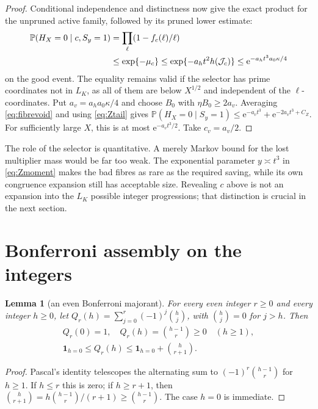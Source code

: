 \documentclass[10pt,reqno]{amsart}
\newtheorem{lemma}[theorem]{Lemma}
\theoremstyle{remark}
\newcommand{\J}{\mathcal J}
\newcommand{\Prob}{\mathbb P}
\newcommand{\ind}{\mathbf1}
\newcommand{\e}{\mathrm e}
\begin{document}
\begin{proof}
Conditional independence and distinctness now give the exact product for
the unpruned active family, followed by its pruned lower estimate:
\begin{align}
 \Prob(H_X=0\mid c,S_y=1)
 &=\prod_\ell(1-f_c(\ell)/\ell)\notag\\
 &\leq\exp\{-\mu_c\}
 \leq\exp\{-a_ht^2h(\J_c)\}
 \leq\e^{-a_ht^3a_0\kappa/4}                 \label{eq:fibrevoid}
\end{align}
on the good event.  The equality remains valid if the selector has prime
coordinates not in $L_K$, as all of them are below $X^{1/2}$ and independent
of the $\ell$-coordinates.  Put $a_v=a_ha_0\kappa/4$ and choose
$B_0$ with $\eta B_0\geq2a_v$.  Averaging \eqref{eq:fibrevoid} and
using \eqref{eq:Ztail} gives
$\Prob(H_X=0\mid S_y=1)\leq\e^{-a_vt^3}+\e^{-2a_vt^3+C_Z}$.
For sufficiently large $X$, this is at most $\e^{-a_vt^3/2}$.
Take $c_v=a_v/2$.
\end{proof}

The role of the selector is quantitative.  A merely Markov bound for the
lost multiplier mass would be far too weak.  The exponential parameter
$y\asymp t^3$ in \eqref{eq:Zmoment} makes the bad fibres as rare as the
required saving, while its own congruence expansion still has acceptable
size.  Revealing $c$ above is not an expansion into the $L_K$ possible
integer progressions; that distinction is crucial in the next section.

\section{Bonferroni assembly on the integers}\label{sec:assembly}
\begin{lemma}[an even Bonferroni majorant]\label{lem:Bonferroni}
For every even integer $r\geq0$ and every integer $h\geq0$, let
$Q_r(h)=\sum_{j=0}^r(-1)^j\binom hj$, with $\binom hj=0$ for $j>h$.
Then
\begin{equation}\label{eq:Bonferroni}
 \begin{gathered}
 Q_r(0)=1,\quad Q_r(h)=\binom{h-1}r\geq0\quad(h\geq1),\\
 \ind_{h=0}\leq Q_r(h)\leq\ind_{h=0}+\binom h{r+1}.
 \end{gathered}
\end{equation}
\end{lemma}
\begin{proof}
Pascal's identity telescopes the alternating sum to
$(-1)^r\binom{h-1}r$ for $h\geq1$.
If $h\leq r$ this is zero; if $h\geq r+1$, then
$\binom h{r+1}=h\binom{h-1}r/(r+1)\geq\binom{h-1}r$.
The case $h=0$ is immediate.
\end{proof}
\end{document}
